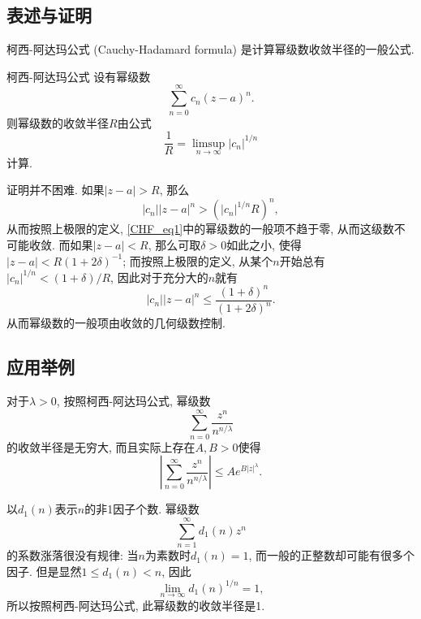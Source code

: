 
\subsection{表述与证明}

柯西-阿达玛公式 (Cauchy-Hadamard formula) 是计算幂级数收敛半径的一般公式.

\begin{theorem}{柯西-阿达玛公式}
设有幂级数
\begin{equation}\label{CHF_eq1}
\sum_{n=0}^\infty c_n(z-a)^n.
\end{equation}
则幂级数的收敛半径$R$由公式
$$
\frac{1}{R}=\limsup_{n\to\infty}|c_n|^{1/n}
$$
计算.
\end{theorem}
证明并不困难. 如果$|z-a|>R$, 那么
$$
|c_n||z-a|^n>(|c_n|^{1/n}R)^n,
$$
从而按照上极限的定义, \autoref{CHF_eq1}中的幂级数的一般项不趋于零, 从而这级数不可能收敛. 而如果$|z-a|<R$, 那么可取$\delta>0$如此之小, 使得$|z-a|<R(1+2\delta)^{-1}$; 而按照上极限的定义, 从某个$n$开始总有$|c_n|^{1/n}<(1+\delta)/R$, 因此对于充分大的$n$就有
$$
|c_n||z-a|^n\leq\frac{(1+\delta)^n}{(1+2\delta)^n}.
$$
从而幂级数的一般项由收敛的几何级数控制.

\subsection{应用举例}
对于$\lambda>0$, 按照柯西-阿达玛公式, 幂级数
$$
\sum_{n=0}^\infty\frac{z^n}{n^{n/\lambda}}
$$
的收敛半径是无穷大, 而且实际上存在$A,B>0$使得
$$
\left|\sum_{n=0}^\infty\frac{z^n}{n^{n/\lambda}}\right|
\leq Ae^{B|z|^\lambda}.
$$

以$d_1(n)$表示$n$的非1因子个数. 幂级数
$$
\sum_{n=1}^\infty d_1(n)z^n
$$
的系数涨落很没有规律: 当$n$为素数时$d_1(n)=1$, 而一般的正整数却可能有很多个因子. 但是显然$1\leq d_1(n)<n$, 因此
$$
\lim_{n\to\infty}d_1(n)^{1/n}=1,
$$
所以按照柯西-阿达玛公式, 此幂级数的收敛半径是1.